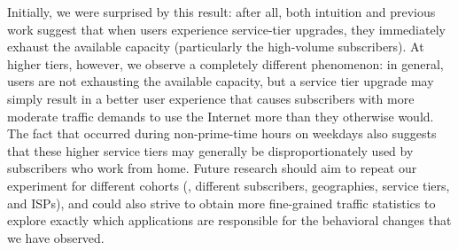 Initially, we were surprised by this result: after all, both intuition
and previous work suggest that when users experience service-tier
upgrades, they immediately exhaust the available capacity (particularly
the high-volume subscribers). At higher tiers, however, we observe a
completely different phenomenon: in general, users are not exhausting
the available capacity, but a service tier upgrade may simply result in
a better user experience that causes subscribers with more moderate
traffic demands to use the Internet more than they otherwise would.  The
fact that 
occurred during non-prime-time hours on
weekdays also suggests that these higher service tiers may generally be
disproportionately used by subscribers who work from home.  Future
research should aim to repeat our experiment for different cohorts (\ie,
different subscribers, geographies, service tiers, and ISPs), and could
also strive to obtain more fine-grained traffic statistics to explore
exactly which applications are responsible for the behavioral changes
that we have observed.
%
%
%
%
